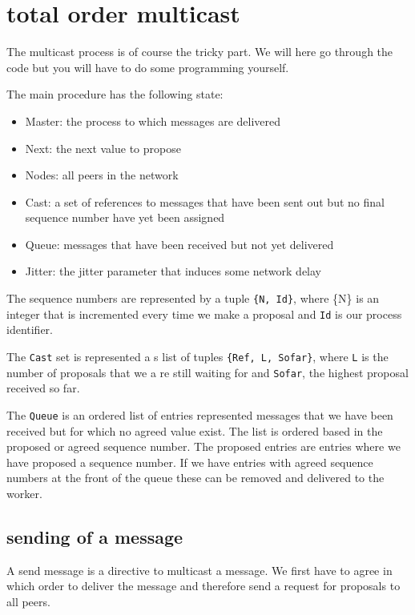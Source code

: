\documentclass[a4paper,11pt]{article}
\begin{document}
\section{total order multicast}

The multicast process is of course the tricky part. We will here go
through the code but you will have to do some programming yourself.

The main procedure has the following state:

\begin{itemize}
\item Master: the process to which messages are delivered
\item Next: the next value to propose
\item Nodes: all peers in the network
\item Cast: a set of references to messages that have been sent out
  but no final sequence number have yet been assigned
\item Queue: messages that have been received but not yet delivered
\item Jitter: the jitter parameter that induces some network delay
\end{itemize}

The sequence numbers are represented by a tuple {\tt\{N, Id\}}, where
\{N\} is an integer that is incremented every time we make a proposal
and {\tt Id} is our process identifier. 

The {\tt Cast} set is represented a s list of tuples {\tt \{Ref, L,
  Sofar\}}, where {\tt L} is the number of proposals that we a re
still waiting for and {\tt Sofar}, the highest proposal received so
far. 

The {\tt Queue} is an ordered list of entries represented messages
that we have been received but for which no agreed value exist. The
list is ordered based in the proposed or agreed sequence number. The
proposed entries are entries where we have proposed a sequence
number. If we have entries with agreed sequence numbers at the front
of the queue these can be removed and delivered to the worker.

\subsection{sending of a message}

A send message is a directive to multicast a message. We first have to
agree in which order to deliver the message and therefore send a
request for proposals to all peers. 
\end{document}
